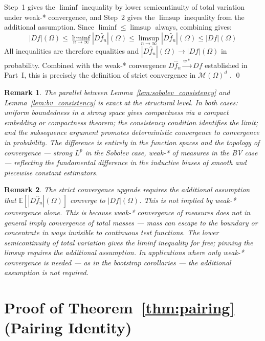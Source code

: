 \documentclass[12pt]{article}
\newtheorem{remark}{Remark}
\newcommand{\E}{\mathbb{E}}
\newcommand{\cM}{\mathcal{M}(\Omega)^d}
\newcommand{\fn}{\hat{f}_n}
\begin{document}
	Step~1 gives the $\liminf$ inequality by lower semicontinuity of total
	variation under weak-* convergence, and Step~2 gives the $\limsup$
	inequality from the additional assumption. Since $\liminf \leq \limsup$
	always, combining gives:
	\begin{equation}
		|Df|(\Omega)
		\leq \liminf_{n \to \infty} |D\fn|(\Omega)
		\leq \limsup_{n \to \infty} |D\fn|(\Omega)
		\leq |Df|(\Omega)
	\end{equation}
	All inequalities are therefore equalities and $|D\fn|(\Omega) \to |Df|(\Omega)$
	in probability. Combined with the weak-* convergence $D\fn \xrightarrow{w*}
	Df$ established in Part~I, this is precisely the definition of strict
	convergence in $\cM$ \citep[Definition~3.13]{ambrosio2000bv}. \qed
	
	\begin{remark}
		The parallel between Lemma~\ref{lem:sobolev_consistency} and
		Lemma~\ref{lem:bv_consistency} is exact at the structural level. In both
		cases: uniform boundedness in a strong space gives compactness via a
		compact embedding or compactness theorem; the consistency condition
		identifies the limit; and the subsequence argument promotes deterministic
		convergence to convergence in probability. The difference is entirely in
		the function spaces and the topology of convergence --- strong $L^p$ in the
		Sobolev case, weak-* of measures in the BV case --- reflecting the
		fundamental difference in the inductive biases of smooth and piecewise
		constant estimators.
	\end{remark}
	
	\begin{remark}
		The strict convergence upgrade requires the additional assumption that
		$\E[|D\fn|(\Omega)]$ converge to $|Df|(\Omega)$. This is not implied by
		weak-* convergence alone. This is because weak-* convergence of measures does not
		in general imply convergence of total masses --- mass can escape to the
		boundary or concentrate in ways invisible to continuous test functions. The
		lower semicontinuity of total variation \citep[Theorem~5.2]{evans2015measure}
		gives the liminf inequality for free; pinning the limsup requires the
		additional assumption. In applications where only weak-* convergence is
		needed --- as in the bootstrap corollaries --- the additional assumption
		is not required.
	\end{remark}
	
	\section{Proof of Theorem~\ref{thm:pairing} (Pairing Identity)}
	\label{app:thm_pairing}
	
\end{document}
